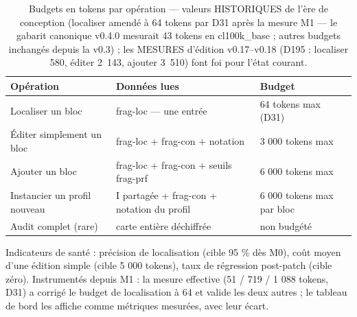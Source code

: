 \begin{table}[htbp]
\centering\small
\caption{Budgets en tokens par opération — valeurs HISTORIQUES de l'ère de conception (localiser amendé à 64 tokens par D31 après la mesure M1 — le gabarit canonique v0.4.0 mesurait 43 tokens en cl100k\_base ; autres budgets inchangés depuis la v0.3) ; les MESURES d'édition v0.17--v0.18 (D195 : localiser 580, éditer 2~143, ajouter 3~510) font foi pour l'état courant.}
\label{tab:budgets}
\begin{tabularx}{\textwidth}{@{}Y Y l@{}}
\toprule
\textbf{Opération} & \textbf{Données lues} & \textbf{Budget} \\
\midrule
Localiser un bloc & frag-loc — une entrée & 64 tokens max (D31) \\
Éditer simplement un bloc & frag-loc + frag-con + notation & 3 000 tokens max \\
Ajouter un bloc & frag-loc + frag-con + seuils frag-prf & 6 000 tokens max \\
Instancier un profil nouveau & I partagée + frag-con + notation du profil & 6 000 tokens
max par bloc \\
Audit complet (rare) & carte entière déchiffrée & non budgété \\
\bottomrule
\end{tabularx}
\end{table}

Indicateurs de santé : précision de localisation (cible 95 \% dès M0), coût moyen d’une
édition simple (cible 5 000 tokens), taux de régression post-patch (cible zéro).
Instrumentés depuis M1 : la mesure effective (51 / 719 / 1 088 tokens, D31) a corrigé
le budget de localisation à 64 et valide les deux autres ; le tableau de bord les
affiche comme métriques mesurées, avec leur écart.
